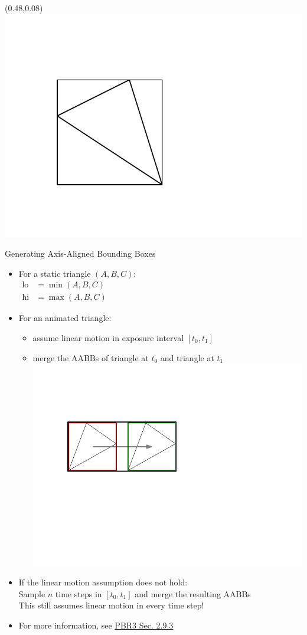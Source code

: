 \documentclass[utf8,stillsansserifmath,fleqn,t]{beamer}
\begin{document}
\begin{frame}[label=aabb-3]
\frametitle{\insertsection}
\begin{textblock}{0.15}(0.48,0.08) \includegraphics[width=\textwidth]{./fig/aabb-triangle-0.pdf} \end{textblock}
Generating Axis-Aligned Bounding Boxes
\begin{itemize}
\item For a static triangle $(A,B,C)$:\\
    $\begin{aligned}
    \text{lo} &= \min(A,B,C)\\
    \text{hi} &= \max(A,B,C)\end{aligned}$
\item For an animated triangle:
    \begin{itemize}
    \item assume linear motion in exposure interval $[t_0, t_1]$
    \item merge the AABBs of triangle at $t_0$ and triangle at $t_1$\\
    \includegraphics[width=.35\textwidth]{./fig/aabb-triangle-1.pdf}
    \end{itemize}
\item If the linear motion assumption does not hold:\\
    Sample $n$ time steps in $[t_0,t_1]$ and merge the resulting AABBs\\
    This still assumes linear motion in every time step!
\item For more information, see \href{https://www.pbr-book.org/3ed-2018/Geometry_and_Transformations/Animating_Transformations}{PBR3 Sec. 2.9.3}
\end{itemize}
\end{frame}
\end{document}
